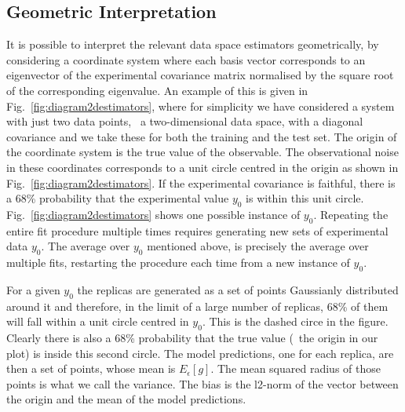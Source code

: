 \subsection{Geometric Interpretation}

It is possible to interpret the relevant data space estimators geometrically, by
considering a coordinate system where each basis vector corresponds to an
eigenvector of the experimental covariance matrix normalised by the square root
of the corresponding eigenvalue. An example of this is given in
Fig.~\ref{fig:diagram2destimators}, where for simplicity we have considered a
system with just two data points, \ie\ a two-dimensional data space, with a
diagonal covariance and we take these for both the training and the test set.
The origin of the coordinate system is the true value of
the observable. The observational noise in these coordinates corresponds to a
unit circle centred in the origin as shown in
Fig.~\ref{fig:diagram2destimators}. If the experimental covariance is faithful,
there is a 68\%  probability that the experimental value $y_0$ is within this
unit circle. Fig.~\ref{fig:diagram2destimators} shows one possible instance of
$y_0$. Repeating the entire fit procedure multiple times requires generating new
sets of experimental data $y_0$. The average over $y_0$ mentioned above, is
precisely the average over multiple fits, restarting the procedure each time
from a new instance of $y_0$.

For a given $y_0$ the replicas are generated as a set of points Gaussianly
distributed around it and therefore, in the limit of a large number of replicas,
68\% of them will fall within a unit circle centred in $y_0$. This is the dashed
circe in the figure. Clearly there is also a 68\% probability that the true
value (\ie\ the origin in our plot) is inside this second circle. The model
predictions, one for each replica, are then a set of points, whose mean is
$E_\epsilon[g]$. The mean squared radius of those points is what we call the
variance. The bias is the l2-norm of the vector between the origin and the mean
of the model predictions. 


